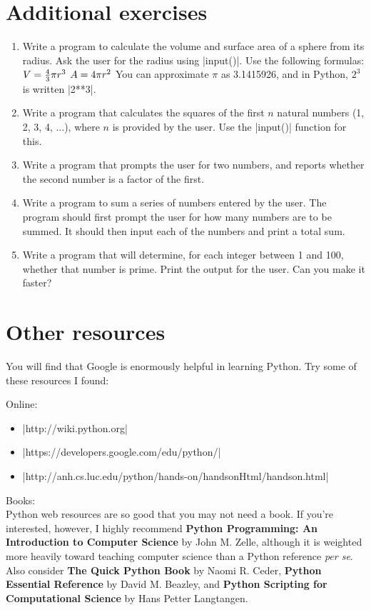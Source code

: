 \documentclass{article}
\begin{document}
\section*{Additional exercises}
\begin{enumerate}

 \item Write a program to calculate the volume and surface area of a sphere from
its radius.  Ask the user for the radius using |input()|.  Use the following
formulas:
$\\V = \frac{4}{3} \pi r^{3}$
$\\A = 4 \pi r^{2}\\$
You can approximate $\pi$ as 3.1415926, and in Python, $2^{3}$ is written
|2**3|.

 \item Write a program that calculates the squares of the first $n$ natural
numbers (1, 2, 3, 4, ...), where $n$ is provided by the user.  Use the |input()|
function for this.

 \item Write a program that prompts the user for two numbers, and reports whether
the second number is a factor of the first.

 \item Write a program to sum a series of numbers entered by the user.  The
program should first prompt the user for how many numbers are to be summed.  It
should then input each of the numbers and print a total sum.

\item Write a program that will determine, for each integer between 1 and 100,
whether that number is prime.  Print the output for the user.  Can you make it
faster?

\end{enumerate}


\section*{Other resources}
You will find that Google is enormously helpful in learning Python.  Try
some of these resources I found:

\noindent Online:
\begin{itemize}
 \item |http://wiki.python.org|
 \item |https://developers.google.com/edu/python/|
 \item |http://anh.cs.luc.edu/python/hands-on/handsonHtml/handson.html|
\end{itemize}

\noindent Books:\\
Python web resources are so good that you may not need a book.  If you're interested, however, I highly recommend 
\textbf{Python Programming: An Introduction to Computer Science} by John M. Zelle, 
although it is weighted more heavily toward teaching computer science than
 a Python reference \textit{per se}.  Also consider \textbf{The Quick Python Book} by Naomi R. Ceder, \textbf{Python Essential Reference} by David M. Beazley, and \textbf{Python Scripting for Computational Science} by Hans Petter Langtangen.
\end{document}
